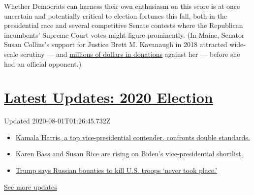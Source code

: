 Whether Democrats can harness their own enthusiasm on this score is at
once uncertain and potentially critical to election fortunes this fall,
both in the presidential race and several competitive Senate contests
where the Republican incumbents' Supreme Court votes might figure
prominently. (In Maine, Senator Susan Collins's support for Justice
Brett M. Kavanaugh in 2018 attracted wide-scale scrutiny --- and
\href{https://www.vox.com/policy-and-politics/2018/10/6/17945900/susan-collins-speech-crowdpac-susan-rice}{millions
of dollars in donations} against her --- before she had an official
opponent.)

\hypertarget{latest-updates-2020-election}{%
\section{\texorpdfstring{\href{https://www.nytimes.com/2020/07/31/us/elections/biden-vs-trump.html?action=click\&pgtype=Article\&state=default\&region=MAIN_CONTENT_1\&context=storylines_live_updates}{Latest
Updates: 2020
Election}}{Latest Updates: 2020 Election}}\label{latest-updates-2020-election}}

Updated 2020-08-01T01:26:45.732Z

\begin{itemize}
\tightlist
\item
  \href{https://www.nytimes.com/2020/07/31/us/elections/biden-vs-trump.html?action=click\&pgtype=Article\&state=default\&region=MAIN_CONTENT_1\&context=storylines_live_updates\#link-29fdff45}{Kamala
  Harris, a top vice-presidential contender, confronts double
  standards.}
\item
  \href{https://www.nytimes.com/2020/07/31/us/elections/biden-vs-trump.html?action=click\&pgtype=Article\&state=default\&region=MAIN_CONTENT_1\&context=storylines_live_updates\#link-13ec3d9c}{Karen
  Bass and Susan Rice are rising on Biden's vice-presidential
  shortlist.}
\item
  \href{https://www.nytimes.com/2020/07/31/us/elections/biden-vs-trump.html?action=click\&pgtype=Article\&state=default\&region=MAIN_CONTENT_1\&context=storylines_live_updates\#link-49e9a016}{Trump
  says Russian bounties to kill U.S. troops `never took place.'}
\end{itemize}

\href{https://www.nytimes.com/2020/07/31/us/elections/biden-vs-trump.html?action=click\&pgtype=Article\&state=default\&region=MAIN_CONTENT_1\&context=storylines_live_updates}{See
more updates}

